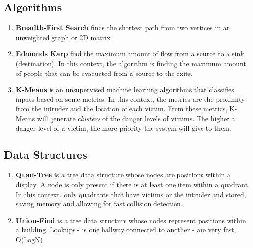 \documentclass[12pt]{article}
\begin{document}
\subsection*{Algorithms}
\begin{enumerate}
\item \textbf{Breadth-First Search} finds the shortest path from two vertices in an unweighted graph or 2D matrix
\item \textbf{Edmonds Karp} find the maximum amount of flow from a source to a sink (destination). In this context, the algorithm is finding the maximum amount of people that can be evacuated from a source to the exits.
\item \textbf{K-Means} is an unsupervised machine learning algorithms that classifies inputs based on some metrics. In this context, the metrics are the proximity from the intruder and the location of each victim. From these metrics, K-Means will generate \textit{clusters} of the danger levels of victims. The higher a danger level of a victim, the more priority the system will give to them.
\end{enumerate}
\subsection*{Data Structures}
\begin{enumerate}
\item \textbf{Quad-Tree} is a tree data structure whose nodes are positions within a display. A node is only present if there is at least one item within a quadrant. In this context, only quadrants that have victims or the intruder and stored, saving memory and allowing for fast collision detection.
\item \textbf{Union-Find} is a tree data structure whose nodes represent positions within a building. Lookups - is one hallway connected to another - are very fast, O(LogN)
\end{enumerate}
\end{document}
